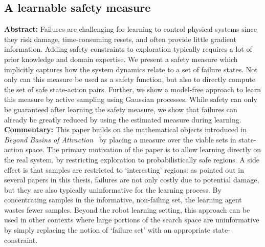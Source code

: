 \subsection{A learnable safety measure}
\textbf{Abstract: }
Failures are challenging for learning to control physical systems since they risk damage, time-consuming resets, and often provide little gradient information. Adding safety constraints to exploration typically requires a lot of prior knowledge and domain expertise. We present a safety measure which implicitly captures how the system dynamics relate to a set of failure states. Not only can this measure be used as a safety function, but also to directly compute the set of safe state-action pairs. Further, we show a model-free approach to learn this measure by active sampling using Gaussian processes. While safety can only be guaranteed after learning the safety measure, we show that failures can already be greatly reduced by using the estimated measure during learning. \\
\textbf{Commentary: }
This paper builds on the mathematical objects introduced in \emph{Beyond Basins of Attraction}~\cite{heim2019beyond} by placing a measure over the viable sets in state-action space. The primary motivation of the paper is to allow learning directly on the real system, by restricting exploration to probabilistically safe regions. A side effect is that samples are restricted to `interesting' regions: as pointed out in several papers in this thesis, failures are not only costly due to potential damage, but they are also typically uninformative for the learning process. By concentrating samples in the informative, non-failing set, the learning agent wastes fewer samples. Beyond the robot learning setting, this approach can be used in other contexts where large portions of the search space are uninformative by simply replacing the notion of `failure set' with an appropriate state-constraint. \\
